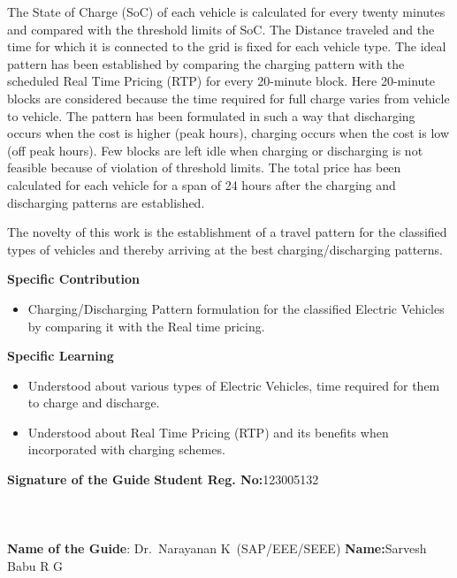 \documentclass[a4paper, 12pt, oneside]{sastra}
\begin{document}
	 \noindent The State of Charge (SoC) of each vehicle is calculated for every twenty minutes and compared with the threshold limits of SoC. The Distance traveled and the time for which it is connected to the grid is fixed for each vehicle type. The ideal pattern has been established by comparing the charging pattern with the scheduled Real Time Pricing (RTP) for every 20-minute block. Here 20-minute blocks are considered because the time required for full charge varies from vehicle to vehicle. The pattern has been formulated in such a way that discharging occurs when the cost is higher (peak hours), charging occurs when the cost is low (off peak hours). Few blocks are left idle when charging or discharging is not feasible because of violation of threshold limits. The total price has been calculated for each vehicle for a span of 24 hours after the charging and discharging patterns are established.
	
	\noindent The novelty of this work is the establishment of a travel pattern for the classified types of vehicles and thereby arriving at the best charging/discharging patterns.
	
	
	\noindent \textbf{Specific Contribution}
	\begin{itemize}
		\item Charging/Discharging Pattern formulation for the classified Electric Vehicles by comparing it with the Real time pricing.
	\end{itemize}
	\noindent \textbf{Specific Learning}
	\begin{itemize}
		\item Understood about various types of Electric Vehicles, time required for them to charge and discharge.
		\item Understood about Real Time Pricing (RTP) and its benefits when incorporated with charging schemes.
	\end{itemize}
	
	\vspace*{24pt}
	
	\noindent \textbf{Signature of the Guide} \hspace*{66mm} \textbf{Student Reg. No:}123005132\\
		\\
	\\
	\\
\noindent \textbf{Name of the Guide}:{ Dr.~Narayanan K}~(SAP/EEE/SEEE) \hspace*{10mm} \textbf{Name:}{Sarvesh Babu R G}
\pagebreak
	
\end{document}
